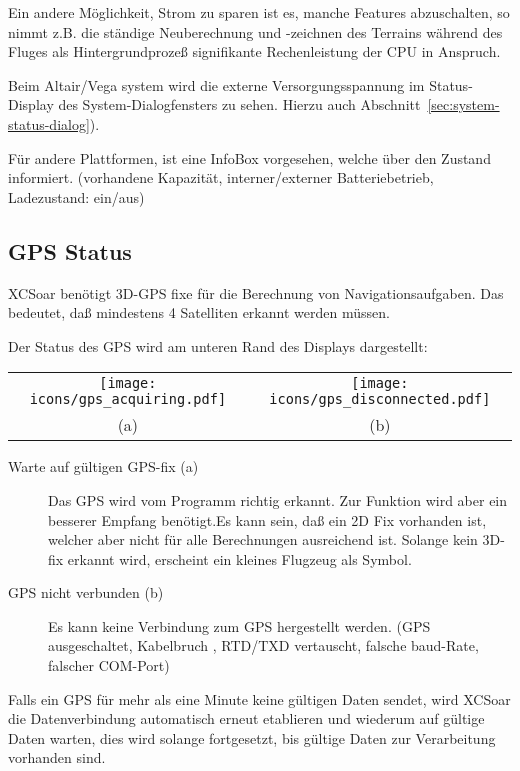 Ein andere Möglichkeit, Strom zu sparen ist es, manche Features abzuschalten, so nimmt z.B. die ständige Neuberechnung und -zeichnen des Terrains während des Fluges als Hintergrundprozeß  signifikante Rechenleistung der CPU in Anspruch.

Beim \textsf{Altair}/Vega system wird die externe Versorgungsspannung im Status-Display des System-Dialogfensters zu sehen.
 Hierzu auch Abschnitt~\ref{sec:system-status-dialog}).

Für andere Plattformen, ist eine  InfoBox vorgesehen, welche über den Zustand informiert.
(vorhandene Kapazität, interner/externer Batteriebetrieb, Ladezustand: ein/aus)

\subsection*{GPS Status}

\textsf{XCSoar} benötigt 3D-GPS fixe für die Berechnung von Navigationsaufgaben.
Das bedeutet, daß mindestens 4 Satelliten erkannt werden müssen.

Der Status des GPS wird am unteren Rand des Displays dargestellt:

\begin{tabular}{c c}%
\texttt{[image: icons/gps\_acquiring.pdf]} & \texttt{[image: icons/gps\_disconnected.pdf]}\\
(a) & (b)
\end{tabular}

\begin{description}
\item[Warte auf gültigen GPS-fix (a)]  Das GPS wird vom Programm richtig erkannt. Zur Funktion wird aber ein besserer Empfang benötigt.Es kann sein, daß ein 2D Fix vorhanden ist, welcher aber nicht für alle Berechnungen ausreichend ist.
Solange kein 3D-fix erkannt wird, erscheint ein kleines Flugzeug als Symbol.

\item[GPS nicht verbunden (b)]  Es kann keine Verbindung zum GPS hergestellt werden.
 (GPS ausgeschaltet, Kabelbruch , RTD/TXD vertauscht, falsche baud-Rate, falscher COM-Port)
\end{description}

Falls ein GPS für mehr als eine Minute keine gültigen Daten sendet, wird \textsf{XCSoar} die Datenverbindung
automatisch erneut etablieren und wiederum auf gültige Daten warten, dies wird solange fortgesetzt,
bis gültige Daten zur Verarbeitung vorhanden sind.


